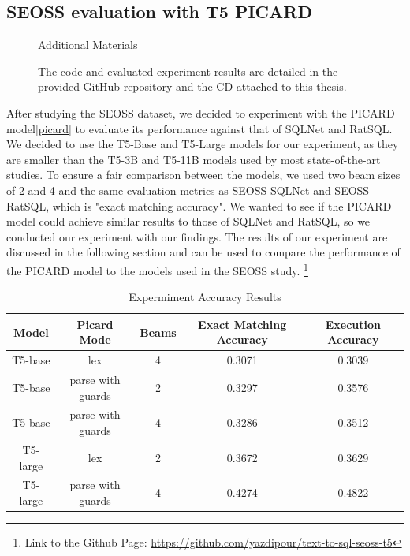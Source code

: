 \subsection{SEOSS evaluation with T5 PICARD}

\begin{figure}[H]
    \begin{AIbox}{Additional Materials}
        \parbox{1\textwidth}{
            The code and evaluated experiment results are detailed in the provided GitHub repository and the CD attached to this thesis.
        }
    \end{AIbox}
\end{figure}

After studying the SEOSS dataset, we decided to experiment with the PICARD model\ref{picard} to evaluate its performance against that of SQLNet and RatSQL. We decided to use the T5-Base and T5-Large models for our experiment, as they are smaller than the T5-3B and T5-11B models used by most state-of-the-art studies. To ensure a fair comparison between the models, we used two beam sizes of 2 and 4 and the same evaluation metrics as SEOSS-SQLNet and SEOSS-RatSQL, which is "exact matching accuracy". We wanted to see if the PICARD model could achieve similar results to those of SQLNet and RatSQL, so we conducted our experiment with our findings. The results of our experiment are discussed in the following section and can be used to compare the performance of the PICARD model to the models used in the SEOSS study.
\footnote[1]{Link to the Github Page: \url{https://github.com/yazdipour/text-to-sql-seoss-t5}}

\begin{table}[!ht]
    \centering
    \begin{tabular}{ccccc}
        \hline
        Model    & Picard Mode       & Beams & \textbf{Exact Matching Accuracy} & \textbf{Execution Accuracy} \\ \hline
        T5-base  & lex               & 4     & 0.3071                           & 0.3039                      \\ \hline
        T5-base  & parse with guards & 2     & 0.3297                           & 0.3576                      \\ \hline
        T5-base  & parse with guards & 4     & 0.3286                           & 0.3512                      \\ \hline
        T5-large & lex               & 2     & 0.3672                           & 0.3629                      \\ \hline
        T5-large & parse with guards & 4     & 0.4274                           & 0.4822                      \\ \hline
    \end{tabular}
    \caption{Expermiment Accuracy Results}
    \label{tab:exp-acc-t5}
\end{table}

